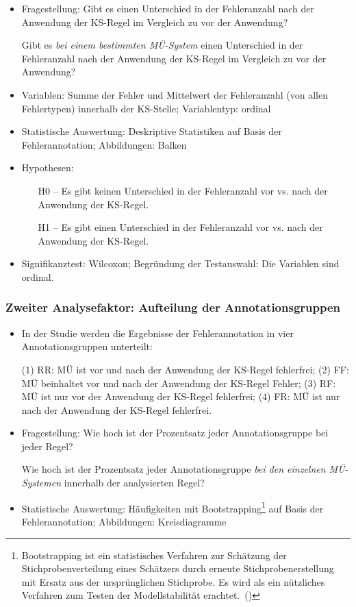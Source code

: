 \begin{itemize}
\item Fragestellung: Gibt es einen Unterschied in der Fehleranzahl nach der Anwendung der KS-Regel im Vergleich zu vor der Anwendung?

Gibt es \textit{bei einem bestimmten MÜ-System} einen Unterschied in der Fehleranzahl nach der Anwendung der KS-Regel im Vergleich zu vor der Anwendung?

\item Variablen: Summe der Fehler und Mittelwert der Fehleranzahl (von allen Fehlertypen) innerhalb der KS-Stelle; Variablentyp: ordinal
\item Statistische Auswertung: Deskriptive Statistiken auf Basis der Fehlerannotation; Abbildungen: Balken
\item Hypothesen:

  \begin{itemize}[align = left]

  \item[H0 --] Es gibt keinen Unterschied in der Fehleranzahl vor vs. nach der Anwendung der KS-Regel.

  \item[H1 --] Es gibt einen Unterschied in der Fehleranzahl vor vs. nach der Anwendung der KS-Regel.

\end{itemize}

\item Signifikanztest: Wilcoxon; Begründung der Testauswahl: Die Variablen sind ordinal.
\end{itemize}

\subsubsection{Zweiter Analysefaktor: Aufteilung der Annotationsgruppen}

\begin{itemize}
\item In der Studie werden die Ergebnisse der Fehlerannotation in vier Annotationsgruppen unterteilt:

(1) RR: MÜ ist vor und nach der Anwendung der KS-Regel fehlerfrei;
(2) FF: MÜ beinhaltet vor und nach der Anwendung der KS-Regel Fehler;
(3) RF: MÜ ist nur vor der Anwendung der KS-Regel fehlerfrei;
(4) FR: MÜ ist nur nach der Anwendung der KS-Regel fehlerfrei.

\item Fragestellung: Wie hoch ist der Prozentsatz jeder Annotationsgruppe bei jeder Regel?

Wie hoch ist der Prozentsatz jeder Annotationsgruppe \textit{bei den einzelnen MÜ-Systemen} innerhalb der analysierten Regel?

\item Statistische Auswertung: Häufigkeiten mit Bootstrapping\footnote{{{{Bootstrapping ist ein statistisches Verfahren zur Schätzung der Stichprobenverteilung eines Schätzers durch erneute Stichprobenerstellung mit Ersatz aus der ursprünglichen Stichprobe. Es wird als ein nützliches Verfahren zum Testen der Modellstabilität erachtet.~(\citealt{IBMnodate})}}}} auf Basis der Fehlerannotation; Abbildungen: Kreisdiagramme
\end{itemize}

